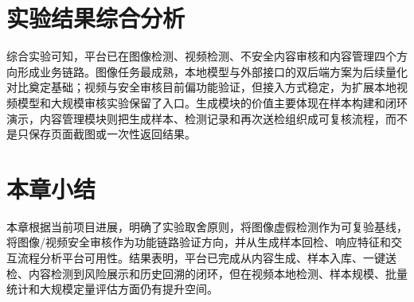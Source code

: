 \section{实验结果综合分析}

综合实验可知，平台已在图像检测、视频检测、不安全内容审核和内容管理四个方向形成业务链路。图像任务最成熟，本地模型与外部接口的双后端方案为后续量化对比奠定基础；视频与安全审核目前偏功能验证，但接入方式稳定，为扩展本地视频模型和大规模审核实验保留了入口。生成模块的价值主要体现在样本构建和闭环演示，内容管理模块则把生成样本、检测记录和再次送检组织成可复核流程，而不是只保存页面截图或一次性返回结果。

\section{本章小结}

本章根据当前项目进展，明确了实验取舍原则，将图像虚假检测作为可复验基线，将图像/视频安全审核作为功能链路验证方向，并从生成样本回检、响应特征和交互流程分析平台可用性。结果表明，平台已完成从内容生成、样本入库、一键送检、内容检测到风险展示和历史回溯的闭环，但在视频本地检测、样本规模、批量统计和大规模定量评估方面仍有提升空间。
